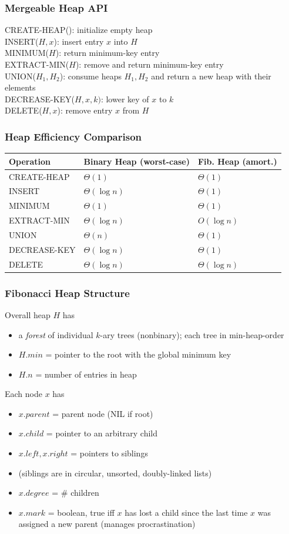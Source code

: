 \documentclass{beamer}
\begin{document}
\begin{frame} \frametitle{Mergeable Heap API}
CREATE-HEAP(): initialize empty heap \\
INSERT($H, x$): insert entry $x$ into $H$ \\
MINIMUM($H$): return minimum-key entry \\
EXTRACT-MIN($H$): remove and return minimum-key entry \\
UNION($H_1, H_2$): consume heaps $H_1, H_2$ and return a new heap with their elements \\
DECREASE-KEY($H, x, k)$: lower key of $x$ to $k$ \\
DELETE($H, x$): remove entry $x$ from $H$
\end{frame}

\begin{frame} \frametitle{Heap Efficiency Comparison}
  \begin{center}
    \begin{tabular}{lll}
      \textbf{Operation} & Binary Heap (worst-case) & Fib. Heap (amort.) \\ \hline
      CREATE-HEAP & $\Theta(1)$ & $\Theta(1)$ \\
      INSERT & $\Theta(\log n)$ & $\Theta(1)$  \\
      MINIMUM & $\Theta(1)$ & $\Theta(1)$ \\
      EXTRACT-MIN &  $\Theta(\log n)$ & $O(\log n)$ \\
      UNION & $\Theta(n)$ & $\Theta(1)$ \\
      DECREASE-KEY & $\Theta(\log n)$ & $\Theta(1)$ \\
      DELETE & $\Theta(\log n)$ & $\Theta(\log n)$
    \end{tabular}
  \end{center}
\end{frame}

\begin{frame} \frametitle{Fibonacci Heap Structure}
Overall heap $H$ has
\begin{itemize}
  \item a \emph{forest} of individual $k$-ary trees (nonbinary); each tree in min-heap-order
  \item $H.min$ = pointer to the root with the global minimum key
  \item $H.n$ = number of entries in heap
\end{itemize}

Each node $x$ has
\begin{itemize}
  \item $x.parent$ = parent node (NIL if root)
  \item $x.child$ = pointer to an arbitrary child
  \item $x.left, x.right$ = pointers to siblings
  \item (siblings are in circular, unsorted, doubly-linked lists)
  \item $x.degree$ = \# children
  \item $x.mark$ = boolean, true iff $x$ has lost a child since the last time
    $x$ was assigned a new parent (manages procrastination)
\end{itemize}
\end{frame}
\end{document}
